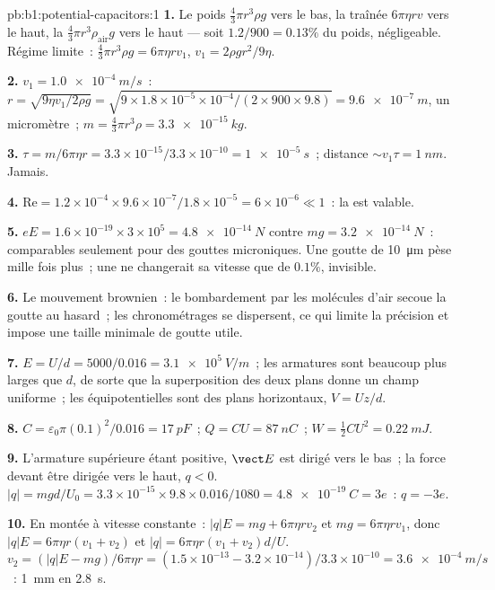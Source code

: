 \begin{solution}{pb:b1:potential-capacitors:1}
\textbf{1.} Le poids $\tfrac43\pi r^3\rho g$ vers le bas, la traînée $6\pi\eta rv$
vers le haut, la  $\tfrac43\pi r^3\rho_{\text{air}}g$ vers le
haut --- soit $1.2/900 = 0.13\%$ du poids, négligeable. Régime limite~: $\tfrac43\pi r^3\rho g = 6\pi\eta rv_1$, $v_1 =
2\rho gr^2/9\eta$.

\textbf{2.} $v_1 = \qty{1.0e-4}{m/s}$~: $r = \sqrt{9\eta v_1/2\rho g} = \sqrt{9 \times
1.8 \times 10^{-5} \times 10^{-4}/(2 \times 900 \times 9.8)} = \qty{9.6e-7}{m}$, un
micromètre~; $m = \tfrac43\pi r^3\rho = \qty{3.3e-15}{kg}$.

\textbf{3.} $\tau = m/6\pi\eta r = 3.3 \times 10^{-15}/3.3 \times 10^{-10} = \qty{1e-5}{s}$~;
distance $\sim v_1\tau = \qty{1}{nm}$. Jamais.

\textbf{4.} $\mathrm{Re} = 1.2 \times 10^{-4} \times 9.6 \times 10^{-7}/1.8 \times 10^{-5} =
6 \times 10^{-6} \ll 1$~: la  est valable.

\textbf{5.} $eE = 1.6 \times 10^{-19} \times 3 \times 10^5 = \qty{4.8e-14}{N}$ contre
$mg = \qty{3.2e-14}{N}$~: comparables seulement pour des gouttes microniques. Une
goutte de \qty{10}{\micro m} pèse mille fois plus~; une  ne
changerait sa vitesse que de $0.1\%$, invisible.

\textbf{6.} Le mouvement brownien~: le bombardement par les molécules d'air
secoue la goutte au hasard~; les chronométrages se dispersent, ce qui limite la
précision et impose une taille minimale de goutte utile.

\textbf{7.} $E = U/d = 5000/0.016 = \qty{3.1e5}{V/m}$~; les armatures sont
beaucoup plus larges que $d$, de sorte que la superposition des deux plans donne
un champ uniforme~; les équipotentielles sont des plans horizontaux, $V = Uz/d$.

\textbf{8.} $C = \varepsilon_0\pi(0.1)^2/0.016 = \qty{17}{pF}$~; $Q = CU = \qty{87}{nC}$~;
$W = \tfrac12CU^2 = \qty{0.22}{mJ}$.

\textbf{9.} L'armature supérieure étant positive, $\vect E$ est dirigé vers le
bas~; la force devant être dirigée vers le haut, $q < 0$. $|q| = mgd/U_0 = 3.3 \times 10^{-15} \times 9.8 \times 0.016/
1080 = \qty{4.8e-19}{C} = 3e$~: $q = -3e$.

\textbf{10.} En montée à vitesse constante~: $|q|E = mg + 6\pi\eta rv_2$ et $mg =
6\pi\eta rv_1$, donc $|q|E = 6\pi\eta r(v_1 + v_2)$ et $|q| = 6\pi\eta r(v_1 +
v_2)d/U$. $v_2 = (|q|E - mg)/6\pi\eta r = (1.5 \times 10^{-13} - 3.2 \times 10^{-14})/
3.3 \times 10^{-10} = \qty{3.6e-4}{m/s}$~: \qty{1}{mm} en \qty{2.8}{s}.


\end{solution}
